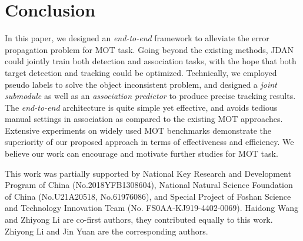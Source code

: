 \documentclass[acmsmall]{acmart}
\begin{document}
\section{Conclusion}
In this paper, we designed an \emph{end-to-end} framework to alleviate the error propagation problem for MOT task.
Going beyond the existing methods, JDAN could jointly train both detection and association tasks, with the hope that both target detection and tracking could be optimized.
Technically, we employed pseudo labels to solve the object inconsistent problem, and designed a \emph{joint submodule} as well as an \emph{association predictor} to produce precise tracking results.
The \emph{end-to-end} architecture is quite simple yet effective, and avoids tedious manual settings in association as compared to the existing MOT approaches.
Extensive experiments on widely used MOT benchmarks demonstrate the superiority of our proposed approach in terms of effectiveness and efficiency.
We believe our work can encourage and motivate further studies for MOT task.






\begin{acks}
	This work was partially supported by National Key Research and Development Program of China (No.2018YFB1308604), National Natural Science Foundation of China (No.U21A20518, No.61976086), and Special Project of Foshan Science and Technology Innovation Team (No. FS0AA-KJ919-4402-0069).
	Haidong Wang and Zhiyong Li are co-first authors, they contributed equally to this work. 
	Zhiyong Li and Jin Yuan are the corresponding authors. 
\end{acks}


\end{document}
